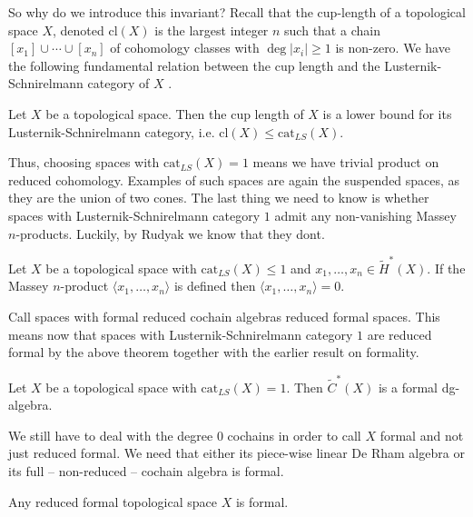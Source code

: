So why do we introduce this invariant? Recall that the cup-length of a topological space 
$X$, denoted $\text{cl}(X)$ is the largest integer $n$ such that a chain 
$[x_1]\cup \cdots \cup [x_n]$ of cohomology classes with $\deg|x_i|\geq 1$ is non-zero. 
We have the following fundamental relation between the cup length and the 
Lusternik-Schnirelmann category of $X$ \cite{lscategorybook}.

\begin{lemma}
    Let $X$ be a topological space. Then the cup length of $X$ is a lower bound for its 
    Lusternik-Schnirelmann category, i.e. $\text{cl}(X)\leq \text{cat}_{LS}(X)$.    
\end{lemma}

Thus, choosing spaces with $\text{cat}_{LS}(X) = 1$ means we have trivial product on 
reduced cohomology. Examples of such spaces are again the suspended spaces, as they are 
the union of two cones. The last thing we need to know is whether spaces with 
Lusternik-Schnirelmann category $1$ admit any non-vanishing Massey  $n$-products. Luckily, 
by Rudyak we know that they dont.

\begin{theorem}
    Let $X$ be a topological space with $\text{cat}_{LS}(X)\leq 1$ and 
    $x_1, \ldots, x_n \in \widetilde{H}^\ast(X)$. If the Massey $n$-product 
    $\langle x_1, \ldots, x_n\rangle$ is defined then 
    $\langle x_1, \ldots, x_n\rangle = 0$.    
\end{theorem}

Call spaces with formal reduced cochain algebras reduced formal spaces. This means now
that spaces with Lusternik-Schnirelmann category $1$ are reduced formal by the above 
theorem together with the earlier result on formality. 

\begin{corollary}
    Let $X$ be a topological space with $\text{cat}_{LS}(X)=1$. Then 
    $\widetilde{C}^\ast(X)$ is a formal dg-algebra. 
\end{corollary}

We still have to deal with the degree $0$ cochains in order to call 
$X$ formal and not just reduced formal. We need that either its piece-wise linear De Rham 
algebra or its full – non-reduced – cochain algebra is formal. 

\begin{theorem}
    Any reduced formal topological space $X$ is formal.     
\end{theorem}

